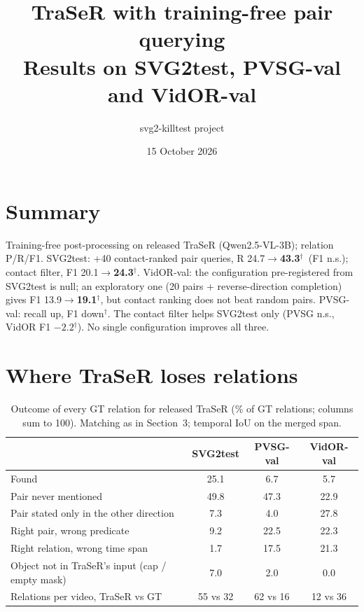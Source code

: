 \documentclass[11pt,a4paper]{article}
\title{\textbf{TraSeR with training-free pair querying}\\[2pt]\large Results on SVG2test, PVSG-val and VidOR-val}
\author{svg2-killtest project}
\date{15 October 2026}
\newcommand{\sig}{$^{\dagger}$}
\begin{document}
\maketitle
\vspace{-8mm}

\section{Summary}
Training-free post-processing on released TraSeR (Qwen2.5-VL-3B); relation P/R/F1.
SVG2test: +40 contact-ranked pair queries, R 24.7$\to$\textbf{43.3}\sig\ (F1 n.s.); contact filter, F1 20.1$\to$\textbf{24.3}\sig.
VidOR-val: the configuration pre-registered from SVG2test is null; an exploratory one (20 pairs + reverse-direction completion)
gives F1 13.9$\to$\textbf{19.1}\sig, but contact ranking does not beat random pairs. PVSG-val: recall up, F1 down\sig. The contact filter helps SVG2test only (PVSG n.s., VidOR F1 $-2.2$\sig).
No single configuration improves all three.

\section{Where TraSeR loses relations}
\begin{table}[H]
\centering
\caption{Outcome of every GT relation for released TraSeR (\% of GT relations; columns sum to 100). Matching as in Section~3; temporal IoU on the
merged span.}
\label{tab:miss}
\small
\begin{tabular}{lccc}
\toprule
 & SVG2test & PVSG-val & VidOR-val \\
\midrule
Found                                          & 25.1 & 6.7  & 5.7  \\
Pair never mentioned                           & 49.8 & 47.3 & 22.9 \\
Pair stated only in the other direction        & 7.3  & 4.0  & 27.8 \\
Right pair, wrong predicate                    & 9.2  & 22.5 & 22.3 \\
Right relation, wrong time span                & 1.7  & 17.5 & 21.3 \\
Object not in TraSeR's input (cap / empty mask) & 7.0  & 2.0  & 0.0  \\
\midrule
Relations per video, TraSeR vs GT              & 55 vs 32 & 62 vs 16 & 12 vs 36 \\
\bottomrule
\end{tabular}
\end{table}
\end{document}
